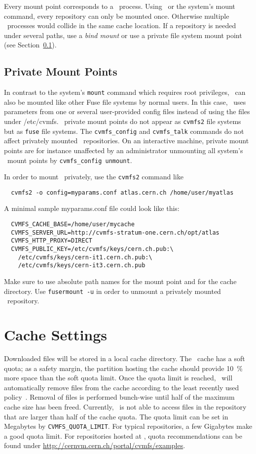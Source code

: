 Every mount point corresponds to a \cvmfs\ process.
Using \autofs\ or the system's mount command, every repository can only be mounted once.
Otherwise multiple \cvmfs\ processes would collide in the same cache location.
If a repository is needed under several paths, use a \emph{bind mount} or use a private file system mount point (see Section~\ref{sct:privatemount}).

\subsection{Private Mount Points}
\label{sct:privatemount}
In contrast to the system's \texttt{mount} command which requires root privileges, \cvmfs\ can also be mounted like other Fuse file systems by normal users.
In this case, \cvmfs\ uses parameters from one or several user-provided config files instead of using the files under /etc/cvmfs.
\cvmfs\ private mount points do not appear as \texttt{cvmfs2} file systems but as \texttt{fuse} file systems.
The \texttt{cvmfs\_config} and \texttt{cvmfs\_talk} commands do not affect privately mounted \cvmfs\ repositories.
On an interactive machine, private mount points are for instance unaffected by an administrator unmounting all system's \cvmfs\ mount points by \texttt{cvmfs\_config unmount}.

In order to mount \cvmfs\ privately, use the \texttt{cvmfs2} command like
\begin{verbatim}
  cvmfs2 -o config=myparams.conf atlas.cern.ch /home/user/myatlas
\end{verbatim}
A minimal sample myparams.conf file could look like this:
\begin{verbatim}
  CVMFS_CACHE_BASE=/home/user/mycache
  CVMFS_SERVER_URL=http://cvmfs-stratum-one.cern.ch/opt/atlas
  CVMFS_HTTP_PROXY=DIRECT
  CVMFS_PUBLIC_KEY=/etc/cvmfs/keys/cern.ch.pub:\
    /etc/cvmfs/keys/cern-it1.cern.ch.pub:\
    /etc/cvmfs/keys/cern-it3.cern.ch.pub
\end{verbatim}

Make sure to use absolute path names for the mount point and for the cache directory.
Use \texttt{fusermount -u} in order to unmount a privately mounted \cvmfs\ repository.


\section{Cache Settings}
\label{sct:config:cache}
Downloaded files will be stored in a local cache directory.
The \cvmfs\ cache has a soft quota; as a safety margin, the partition hosting the cache should provide \SI{10}{\percent} more space than the soft quota limit.
Once the quota limit is reached, \cvmfs\ will automatically remove files from the cache according to the least recently used policy~\cite{lru06}.
Removal of files is performed bunch-wise until half of the maximum cache size has been freed.
Currently, \cvmfs\ is not able to access files in the repository that are larger than half of the cache quota.
The quota limit can be set in Megabytes by \texttt{CVMFS\_QUOTA\_LIMIT}.
For typical repositories, a few Gigabytes make a good quota limit.
For repositories hosted at \cern, quota recommendations can be found under \url{http://cernvm.cern.ch/portal/cvmfs/examples}.

